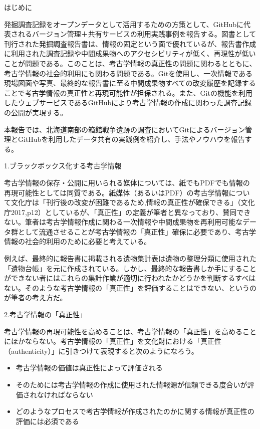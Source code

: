 \documentclass[9pt,b5j,papersize]{jsarticle}
\begin{document}
\begin{multicols}{2}

\noindent
{\large はじめに}

発掘調査記録をオープンデータとして活用するための方策として、GitHubに代表されるバージョン管理＋共有サービスの利用実践事例を報告する。図書として刊行された発掘調査報告書は、情報の固定という面で優れているが、報告書作成に利用された調査記録や中間成果物へのアクセシビリティが低く、再現性が低いことが問題である。このことは、考古学情報の真正性の問題に関わるとともに、考古学情報の社会的利用にも関わる問題である。Gitを使用し、一次情報である現場図面や写真、最終的な報告書に至る中間成果物すべての改変履歴を記録することで考古学情報の真正性と再現可能性が担保される。また、Gitの機能を利用したウェブサービスであるGitHubにより考古学情報の作成に関わった調査記録の公開が実現する。

本報告では、北海道南部の箱館戦争遺跡の調査においてGitによるバージョン管理とGitHubを利用したデータ共有の実践例を紹介し、手法やノウハウを報告する。

\noindent
{\large 1.ブラックボックス化する考古学情報}

考古学情報の保存・公開に用いられる媒体については、紙でもPDFでも情報の再現可能性としては同質である。紙媒体（あるいはPDF）の考古学情報について文化庁は「刊行後の改変が困難であるため,情報の真正性が確保できる」（文化庁2017,p12）としているが、「真正性」の定義が筆者と異なっており、賛同できない。筆者は考古学情報作成に関わる一次情報や中間成果物を再利用可能なデータ群として流通させることが考古学情報の「真正性」確保に必要であり、考古学情報の社会的利用のために必要と考えている。

例えば、最終的に報告書に掲載される遺物集計表は遺物の整理分類に使用された「遺物台帳」を元に作成されている。しかし、最終的な報告書しか手にすることができない者にはこれらの集計作業が適切に行われたかどうかを判断するすべはない。そのような考古学情報の「真正性」を評価することはできない、というのが筆者の考え方だ。

\noindent
{\large 2.考古学情報の「真正性」}

考古学情報の再現可能性を高めることは、考古学情報の「真正性」を高めることにほかならない。考古学情報の「真正性」を文化財における「真正性（authenticity）」に引きつけて表現すると次のようになろう。

\begin{itemize}
\item 考古学情報の価値は真正性によって評価される
\item そのためには考古学情報の作成に使用された情報源が信頼できる度合いが評価されなければならない
\item どのようなプロセスで考古学情報が作成されたのかに関する情報が真正性の評価には必須である
\end{itemize}


\end{multicols}
\end{document}
